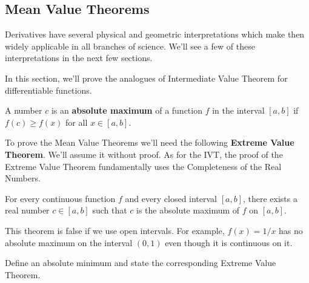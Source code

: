 \subsection{Mean Value Theorems}
Derivatives have several physical and geometric interpretations which make then widely applicable in all branches of science. We'll see a few of these interpretations in the next few sections.

In this section, we'll prove the analogues of Intermediate Value Theorem for differentiable functions.

\begin{definition}
	A number $c$ is an {\bf absolute maximum} of a function $f$ in the interval $[a,b]$ if $f(c) \ge f(x)$ for all $x \in [a,b]$.
\end{definition}
To prove the Mean Value Theorems we'll need the following {\bf Extreme Value Theorem}. We'll assume it without proof. As for the IVT, the proof of the Extreme Value Theorem fundamentally uses the Completeness of the Real Numbers.

\begin{theorem}
	\label{thm:extreme_value_theorem}
	For every continuous function $f$ and every closed interval $[a,b]$, there exists a real number $c \in [a,b]$ such that $c$ is the absolute maximum of $f$ on $[a,b]$.
\end{theorem}

\begin{remark}
	This theorem is false if we use open intervals. For example, $f(x) = 1/x$ has no absolute maximum on the interval $(0,1)$ even though it is continuous on it.
\end{remark}

\begin{exercise}
	Define an absolute minimum and state the corresponding Extreme Value Theorem.
\end{exercise}

%

